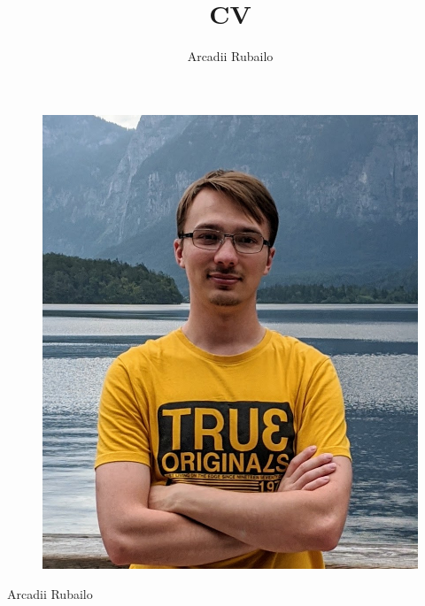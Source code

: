 \documentclass[12pt, a4paper]{article}
\title{CV}
\author{Arcadii Rubailo}
\begin{document}
\begin{minipage}[t]{0.35\textwidth}
    \begin{figure}[H]
        \vspace*{-12pt}
        \includegraphics[width=\textwidth]{profile}
    \end{figure}
    
    \begin{center}
        Arcadii Rubailo
    \end{center}
    

\end{minipage}
\end{document}
